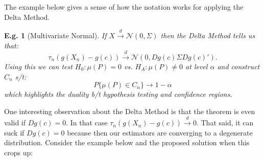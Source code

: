 \documentclass{tufte-book}
\theoremstyle{mytheoremstyle}
\theoremstyle{mylemstyle}
\theoremstyle{mydefstyle}
\newtheorem*{ex}{E.g.}
\begin{document}
The example below gives a sense of how the notation works for applying the Delta Method.
\begin{ex}[Multivariate Normal] If \(X \overset{d}{\rightarrow} \mathcal{N}(0, \Sigma)\) then the Delta Method tells us that:
	\[\tau_n(g(X_n) - g(c)) \overset{d}{\rightarrow} \mathcal{N}(0, Dg(c)\Sigma Dg(c)') \text{.}\]
Using this we can test \(H_0: \mu(P) = 0\) vs. \(H_A: \mu(P) \ne 0\) at level \(\alpha\) and construct \(C_n\) s/t:
	\[P\{\mu(P) \in C_n\} \rightarrow 1-\alpha\]
which highlights the duality b/t hypothesis testing and confidence regions.
\end{ex}
One interesting observation about the Delta Method is that the theorem is even valid if \(Dg(c) = 0\). In that case \(\tau_n (g(X_n) - g(c)) \overset{d}{\rightarrow} 0\). That said, it can suck if \(Dg(c) = 0\) because then our estimators are converging to a degenerate distribution. Consider the example below and the proposed solution when this crops up:
\end{document}
